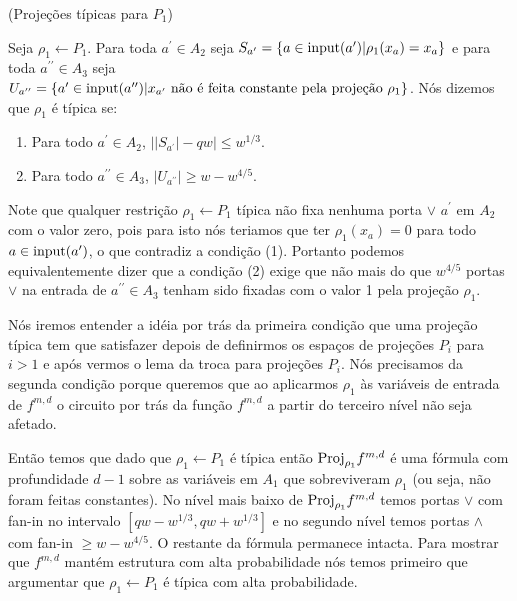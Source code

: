 \begin{defi} (Projeções típicas para $P_{1}$) \label{typical_proj_P1}

Seja $\rho_{1} \leftarrow P_{1}$. Para toda $a^{\prime} \in A_{2}$ seja $S_{a^{\prime}} = \{a \in \text{input}(a^{\prime}) \lvert \rho_{1}(x_{a}) = x_{a} \}$ e para toda $a^{\prime \prime} \in A_{3}$ seja $U_{a^{\prime \prime}} = \{a^{\prime} \in \text{input}(a^{\prime \prime}) \lvert x_{a^{\prime}} \text{ não é feita constante pela projeção } \rho_{1}\}$. Nós dizemos que $\rho_{1}$ é típica se:

\begin{enumerate}

	\item Para todo $a^{\prime} \in A_{2}$, $\big\lvert \lvert S_{a^{\prime}} \rvert - qw \big\rvert \leq w^{1/3}$.
	
	\item Para todo $a^{\prime \prime} \in A_{3}$, $\lvert U_{a^{\prime \prime}} \rvert \geq w - w^{4/5}$.

\end{enumerate}

Note que qualquer restrição $\rho_{1} \leftarrow P_{1}$ típica não fixa nenhuma porta $\lor$ $a^{\prime}$ em $A_{2}$ com o valor zero, pois para isto nós teriamos que ter $\rho_{1}(x_{a}) = 0$ para todo $a \in \text{input}(a^{\prime})$, o que contradiz a condição (1). Portanto podemos equivalentemente dizer que a condição (2) exige que não mais do que $w^{4/5}$ portas $\lor$ na entrada de $a^{\prime \prime} \in A_{3}$ tenham sido fixadas com o valor 1 pela projeção $\rho_{1}$.

\end{defi}

Nós iremos entender a idéia por trás da primeira condição que uma projeção típica tem que satisfazer depois de definirmos os espaços de projeções $P_{i}$ para $i > 1$ e após vermos o lema da troca para projeções $P_{i}$. Nós precisamos da segunda condição porque queremos que ao aplicarmos $\rho_{1}$ às variáveis de entrada de $f^{m, d}$ o circuito por trás da função $f^{m, d}$ a partir do terceiro nível não seja afetado.

Então temos que dado que $\rho_{1} \leftarrow P_{1}$ é típica então $\text{Proj}_{\rho_{1}}f^{m, d}$ é uma fórmula com profundidade $d - 1$ sobre as variáveis em $A_{1}$ que sobreviveram $\rho_{1}$ (ou seja, não foram feitas constantes). No nível mais baixo de $\text{Proj}_{\rho_{1}}f^{m, d}$ temos portas $\lor$ com fan-in no intervalo $[qw - w^{1/3}, qw + w^{1/3}]$ e no segundo nível temos portas $\land$ com fan-in $\geq w - w^{4/5}$. O restante da fórmula permanece intacta.  Para mostrar que $f^{m, d}$ mantém estrutura com alta probabilidade nós temos primeiro que argumentar que $\rho_{1} \leftarrow P_{1}$ é típica com alta probabilidade.

